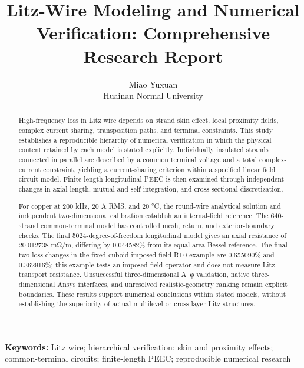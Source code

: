 \documentclass[11pt,a4paper]{article}
\title{Litz-Wire Modeling and Numerical Verification: Comprehensive Research Report}
\author{Miao Yuxuan\\Huainan Normal University}
\date{}
\begin{document}
\maketitle
\begin{abstract}
High-frequency loss in Litz wire depends on strand skin effect, local proximity fields, complex current sharing, transposition paths, and terminal constraints. This study establishes a reproducible hierarchy of numerical verification in which the physical content retained by each model is stated explicitly. Individually insulated strands connected in parallel are described by a common terminal voltage and a total complex-current constraint, yielding a current-sharing criterion within a specified linear field–circuit model. Finite-length longitudinal PEEC is then examined through independent changes in axial length, mutual and self integration, and cross-sectional discretization.

For copper at 200 kHz, 20 A RMS, and 20 °C, the round-wire analytical solution and independent two-dimensional calibration establish an internal-field reference. The 640-strand common-terminal model has controlled mesh, return, and exterior-boundary checks. The final 5024-degree-of-freedom longitudinal model gives an axial resistance of 20.012738 mΩ/m, differing by 0.044582\% from its equal-area Bessel reference. The final two loss changes in the fixed-cuboid imposed-field RT0 example are 0.655090\% and 0.362916\%; this example tests an imposed-field operator and does not measure Litz transport resistance. Unsuccessful three-dimensional A–φ validation, native three-dimensional Ansys interfaces, and unresolved realistic-geometry ranking remain explicit boundaries. These results support numerical conclusions within stated models, without establishing the superiority of actual multilevel or cross-layer Litz structures.
\end{abstract}
\noindent\textbf{Keywords: }Litz wire; hierarchical verification; skin and proximity effects; common-terminal circuits; finite-length PEEC; reproducible numerical research\par


















\renewcommand{\refname}{References}

\end{document}
